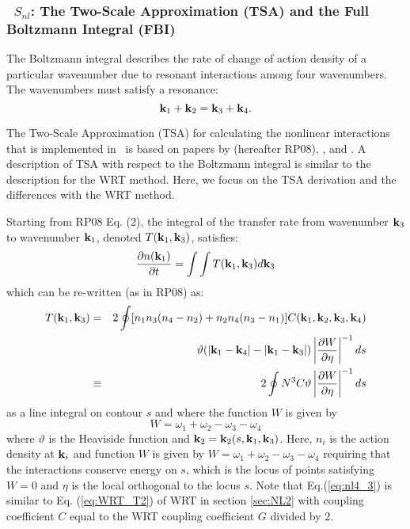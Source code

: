 \vsssub
\subsubsection[~$S_{nl}$: Two-Scale Approximation (TSA)]{~$S_{nl}$: The Two-Scale Approximation (TSA) and the  Full Boltzmann Integral (FBI) \label{sec:NL4}}
\vsssub



\noindent
The Boltzmann integral describes the rate of change of action density of a particular wavenumber due to resonant interactions among four wavenumbers. The wavenumbers must satisfy a resonance:
\begin{equation}
{\bf k}_1 +{\bf k}_2 = {\bf k}_3+{\bf k}_4. 
\end{equation}

The Two-Scale Approximation (TSA) for calculating the nonlinear interactions that is implemented in  \ws\ is based on papers by \cite{art:Resio2008} (hereafter RP08), \cite{art:Perrie2009}, \cite{art:Resio2011} and \cite{art:Perrie2013}. A description of TSA with respect to the Boltzmann integral is similar to the description for the WRT method. Here, we focus on the TSA derivation and the differences with the WRT method.

Starting from RP08 Eq. (2), the integral of the transfer rate from wavenumber ${\bf k}_3$ to wavenumber ${\bf k}_1$, denoted $T({\bf k}_1,{\bf k}_3 )$, satisfies: 
\begin{equation}
\frac{\partial n({\bf k}_1)}{\partial t} = \int \int T ({\bf k}_1,{\bf k}_3 ) d {\bf k}_3 \label{eq:nl4_2}
\end{equation}    
which can be re-written (as in RP08) as: 
\begin{eqnarray}
T({\bf k}_1,{\bf k}_3 ) &=& 2 \oint [n_1 n_3 (n_4-n_2) +n_2n_4(n_3-n_1)] C({\bf k}_1,{\bf k}_2,{\bf k}_3,{\bf k}_4)\nonumber \\
&& \vartheta (|{\bf k}_1-{\bf k}_4|-|{\bf k}_1-{\bf k}_3|) \left|\frac{\partial W}{\partial \eta}\right|^{-1} ds \nonumber\\
& \equiv & 2 \oint N^3 C \vartheta \left|\frac{\partial W}{\partial \eta}\right|^{-1} ds \label{eq:nl4_3}
\end{eqnarray}
as a line integral on contour $s$ and where the function $W$ is given by 
\begin{equation}
W = \omega_1+\omega_2-\omega_3-\omega_4
\end{equation}
where $\vartheta$ is the Heaviside function and ${\bf k}_2={\bf k}_2(s,{\bf k}_1,{\bf k}_3)$. Here, $n_i$ is the action density at ${\bf k}_i$ and function $W$ is given by $W = \omega_1+\omega_2-\omega_3-\omega_4$ requiring that the interactions conserve energy on $s$, which is the locus of points satisfying $W=0$ and $\eta$ is the local orthogonal to the locus $s$. Note that Eq.(\ref{eq:nl4_3}) is similar to Eq. (\ref{eq:WRT_T2}) of WRT in section  \ref{sec:NL2} with coupling coefficient $C$ equal to the WRT coupling coefficient $G$ divided by 2.

